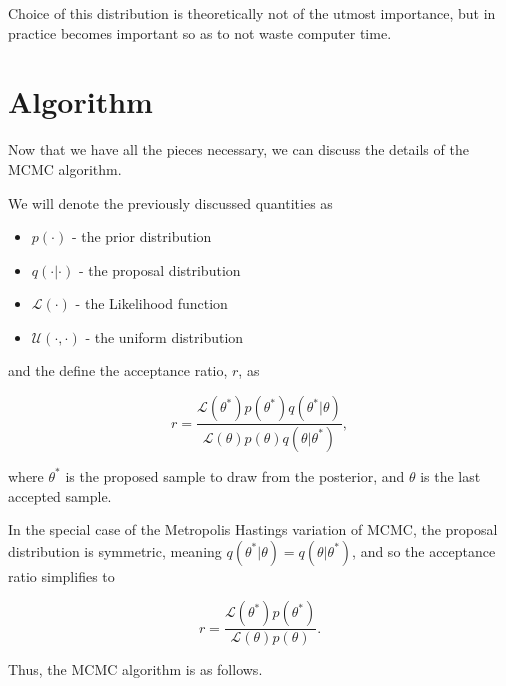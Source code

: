     Choice of this distribution is theoretically not of the utmost importance, but in practice becomes important so as to not waste computer time.


\section{Algorithm}

    Now that we have all the pieces necessary, we can discuss the details of the MCMC algorithm.

    We will denote the previously discussed quantities as

    \begin{itemize}
        \item $p(\cdot)$ - the prior distribution
        \item $q(\cdot|\cdot)$ - the proposal distribution
        \item $\mathcal{L}(\cdot)$ - the Likelihood function
        \item $\mathcal{U}(\cdot,\cdot)$ - the uniform distribution
    \end{itemize}

    and the define the acceptance ratio, $r$, as

    $$
        r = \frac{\mathcal{L}(\theta^*)p(\theta^*)q(\theta^*|\theta)}{\mathcal{L}(\theta)p(\theta)q(\theta|\theta^*)},
    $$

    where $\theta^*$ is the proposed sample to draw from the posterior, and $\theta$ is the last accepted sample.

    In the special case of the Metropolis Hastings variation of MCMC, the proposal distribution is symmetric, meaning $q(\theta^*|\theta) = q(\theta|\theta^*)$, and so the acceptance ratio simplifies to

    $$
        r = \frac{\mathcal{L}(\theta^*)p(\theta^*)}{\mathcal{L}(\theta)p(\theta)}.
    $$

    Thus, the MCMC algorithm is as follows.
    
